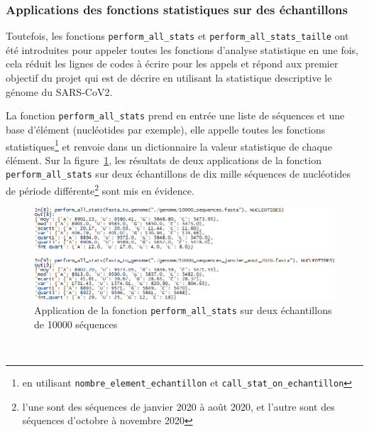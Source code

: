 \documentclass[12pt]{article}
\begin{document}
\subsubsection{Applications des fonctions statistiques sur des échantillons}
Toutefois, les fonctions \texttt{perform\_all\_stats} et \texttt{perform\_all\_stats\_taille} ont été introduites pour appeler toutes les fonctions d'analyse statistique en une fois, cela réduit les lignes de codes à écrire pour les appels et répond aux premier objectif du projet qui est de décrire en utilisant la statistique descriptive le génome du SARS-CoV2.

La fonction \texttt{perform\_all\_stats} prend en entrée une liste de séquences et une base d'élément (nucléotides par exemple), elle appelle toutes les fonctions statistiques\footnote{en utilisant \texttt{nombre\_element\_echantillon} et \texttt{call\_stat\_on\_echantillon}} et renvoie dans un dictionnaire la valeur statistique de chaque élément. Sur la figure~\ref{appnucl10000seq}, les résultats de deux applications de la fonction \texttt{perform\_all\_stats} sur deux échantillons de dix mille séquences de nucléotides de période différente\footnote{l'une sont des séquences de janvier 2020 à août 2020, et l'autre sont des séquences d'octobre à novembre 2020} sont mis en évidence.
    \begin{figure}[!h]
        \centering
        \includegraphics[scale = 0.75]{Images/Stats/app_10000_seq.PNG}
        \caption{Application de la fonction \texttt{perform\_all\_stats} sur deux échantillons de 10000 séquences}
        \label{appnucl10000seq}
    \end{figure}\\

\newpage
    
\end{document}
